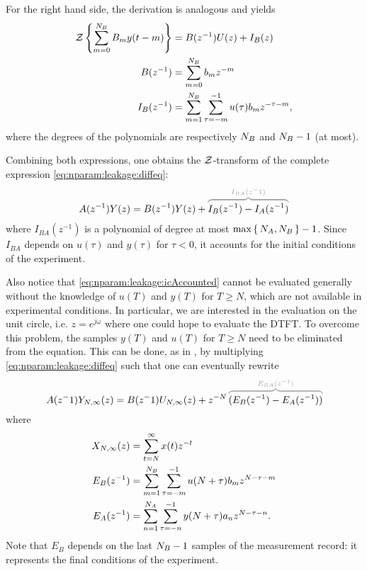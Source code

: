 \documentclass{responseletter}
\begin{document}
\begin{enumerate}
\begin{newquote}
For the right hand side, the derivation is analogous and yields
\begin{align}
  \operatorname{\mathcal{Z}} \left\{ \sum_{m=0}^{N_{B}} B_m y(t-m) \right\} &=
  B(z^{-1}) U(z) + I_{B}(z)\\
  B(z^{-1}) &= \sum_{m=0}^{N_{B}} b_m z^{-m} \\
  I_B(z^{-1}) &= \sum_{m=1}^{N_{B}} \sum_{\tau = -m}^{-1} u(\tau) b_m z^{-\tau-m}
  \text{,}
\end{align}
where the degrees of the polynomials are respectively $N_{B}$ and $N_{B}-1$ (at most).

Combining both expressions, one obtains the $\operatorname{\mathcal{Z}}$-transform of the complete expression \eqref{eq:nparam:leakage:diffeq}:
\begin{align}
  A(z^{-1}) Y(z)= B(z^{-1}) Y(z) + \ezbrace{I_B(z^{-1}) -  I_A(z^{-1})}{I_{BA}(z^-1)}
  \label{eq:nparam:leakage:icAccounted}
\end{align}
where $I_{BA}(z^{-1})$ is a polynomial of degree at most $\max\set{\ensuremath{N_{A}}, \ensuremath{N_{B}}} -1$.
Since $I_{BA}$ depends on $u(\tau)$ and $y(\tau)$ for $\tau < 0$, it accounts for the initial conditions of the experiment.

Also notice that \eqref{eq:nparam:leakage:icAccounted} cannot be evaluated generally without the knowledge of $u(T)$ and $y(T)$ for $T \geq N$, which are not available in experimental conditions.
In particular, we are interested in the evaluation on the unit circle, i.e. $z = e^{j\omega}$ where one could hope to evaluate the \gls{DTFT}.
To overcome this problem, the samples $y(T)$ and $u(T)$ for $T \geq N$ need to be eliminated from the equation.
This can be done, as in \citet[Appendix 6.B.1]{Pintelon2012}, by multiplying \eqref{eq:nparam:leakage:diffeq} such that one can eventually rewrite
\begin{equation}
   A(z^-1) Y_{N,\infty}(z) = B(z^-1) U_{N,\infty}(z) + z^{-N}\ezbrace{(E_{B}(z^{-1}) - E_A(z^{-1}))}{E_{BA}(z^{-1})}
   \label{eq:nparam:leakage:ecAccounted}
 \end{equation}
 where
\begin{align}
  X_{N,\infty}(z) 
  &= \sum_{t=N}^{\infty} x(t)z^{-t}\\
  E_{B}(z^{-1}) 
  &= \sum_{m=1}^{N_{B}} \sum_{\tau = -m}^{-1} u(N+\tau) b_m z^{N-\tau-m}\\
  E_A(z^{-1}) 
  &= \sum_{n=1}^{N_{A}} \sum_{\tau = -n}^{-1} y(N+\tau) a_n z^{N-\tau-n}
  \text{.}
\end{align}
Note that $E_{B}$ depends on the last $N_{B}-1$ samples of the measurement record: it represents the final conditions of the experiment.


\end{newquote}
\end{enumerate}
\end{document}
